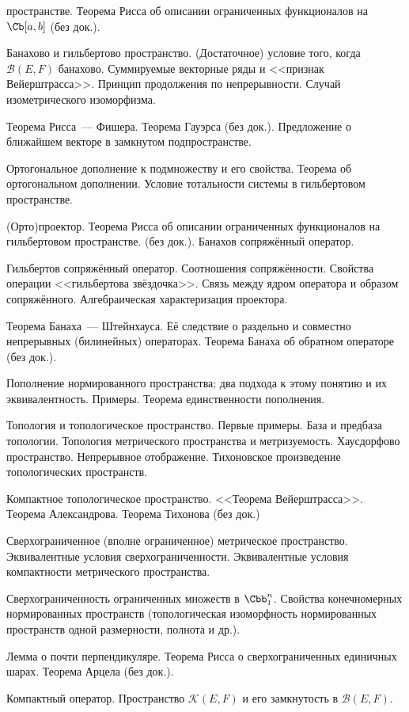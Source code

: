 \documentclass[a4paper]{article}
\begin{document}
\begin{nums}{-3}
пространстве. Теорема Рисса об описании ограниченных функционалов на $\Cb[a,b]$ (без док.).
\item Банахово и гильбертово пространство. (Достаточное) условие того, когда $\mathcal{B}(E,F)$ банахово.
Суммируемые векторные ряды и <<признак Вейерштрасса>>. Принцип продолжения по непрерывности.
Случай изометрического изоморфизма.
\item Теорема Рисса~--- Фишера. Теорема Гауэрса (без док.). Предложение о ближайшем векторе в замкнутом подпространстве.
\item Ортогональное дополнение к подмножеству и его свойства. Теорема об ортогональном дополнении.
Условие тотальности системы в гильбертовом пространстве.
\item (Орто)проектор. Теорема Рисса об описании ограниченных функционалов на гильбертовом пространстве. (без док.).
Банахов сопряжённый оператор.
\item Гильбертов сопряжённый оператор. Соотношения сопряжённости. Свойства операции <<гильбертова звёздочка>>.
Связь между ядром оператора и образом сопряжённого. Алгебраическая характеризация проектора.
\item Теорема Банаха~--- Штейнхауса. Её следствие о раздельно и совместно непрерывных (билинейных) операторах.
Теорема Банаха об обратном операторе (без док.).
\item Пополнение нормированного пространства; два подхода к этому понятию и их эквивалентность. Примеры.
Теорема единственности пополнения.
\item Топология и топологическое пространство. Первые примеры. База и предбаза топологии.
Топология метрического пространства и метризуемость. Хаусдорфово пространство. Непрерывное отображение.
Тихоновское произведение топологических пространств.
\item Компактное топологическое пространство. <<Теорема Вейерштрасса>>. Теорема Александрова. Теорема Тихонова (без док.)
\item Сверхограниченное (вполне ограниченное) метрическое пространство. Эквивалентные условия сверхограниченности.
Эквивалентные условия компактности метрического пространства.
\item Сверхограниченность ограниченных множеств в $\Cbb^n_1$. Свойства конечномерных нормированных пространств
 (топологическая изоморфность нормированных пространств одной размерности, полнота и др.).
\item Лемма о почти перпендикуляре. Теорема Рисса о сверхограниченных единичных шарах. Теорема Арцела (без док.).
\item Компактный оператор. Пространство $\mathcal{K}(E,F)$ и его замкнутость в $\mathcal{B}(E,F)$.

\end{nums}
\end{document}
